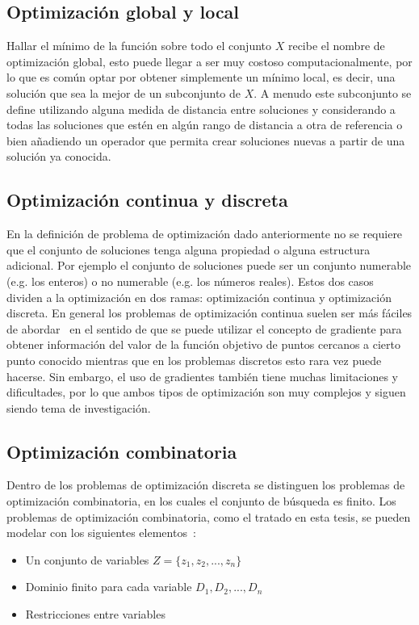 \subsection*{Optimización global y local}

Hallar el mínimo de la función sobre todo el conjunto $X$ recibe el nombre de optimización global, esto puede llegar a ser muy costoso computacionalmente,
por lo que es común optar por obtener simplemente un mínimo local, es decir, una solución que sea la mejor de un subconjunto de $X$. 
%
A menudo este subconjunto se define utilizando alguna medida de distancia entre soluciones y considerando a todas las soluciones que estén en algún rango 
de distancia a otra de referencia o bien añadiendo un operador que permita crear soluciones nuevas a partir de una solución ya conocida.

\subsection*{Optimización continua y discreta}
En la definición de problema de optimización dado anteriormente no se requiere que el conjunto de soluciones tenga alguna propiedad o alguna estructura 
adicional. 
%
Por ejemplo el conjunto de soluciones puede ser un conjunto numerable (e.g. los enteros) o no numerable (e.g. los números reales). 
%
Estos dos casos dividen a la optimización en dos ramas: optimización continua y optimización discreta. 
%
En general los problemas de optimización continua suelen ser más fáciles de abordar~\cite{nocedal2006numerical} en el sentido de que se puede utilizar
el concepto de gradiente para obtener información del valor de la función objetivo de puntos cercanos a cierto punto conocido mientras que en los problemas 
discretos esto rara vez puede hacerse.
%
Sin embargo, el uso de gradientes también tiene muchas limitaciones y dificultades, por lo que ambos tipos de optimización son muy complejos y siguen
siendo tema de investigación.

\subsection*{Optimización combinatoria}
Dentro de los problemas de optimización discreta se distinguen los problemas de optimización combinatoria, en los cuales el conjunto de búsqueda es finito.
%
Los problemas de optimización combinatoria, como el tratado en esta tesis, se pueden modelar con los siguientes elementos~\cite{Blum2003}:

\begin{itemize}
    \item Un conjunto de variables $Z=\{z_1,z_2,...,z_n\}$
    \item Dominio finito para cada variable $D_1,D_2,...,D_n$
    \item Restricciones entre variables
\end{itemize}


